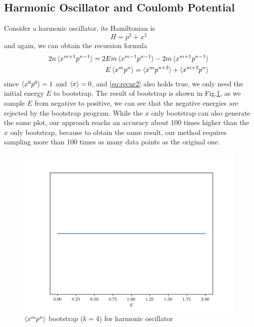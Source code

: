 \documentclass[aps, preprint,amsmath, amssymb]{revtex4-2}
\begin{document}
\subsection{Harmonic Oscillator and Coulomb Potential}

Consider a harmonic oscillator, its Hamiltonian is
\begin{equation}
    H = p^2 + x^2
\end{equation}
and again, we can obtain the recursion formula
\begin{align}
    2n\braket{x^{m + 1} p^{n - 1}} = 2Em\braket{x^{m - 1} p^{n - 1}} - 2m\braket{x^{m + 1} p^{n - 1}}\notag \\
    E\braket{x^m p^n} = \braket{x^m p^{n + 2}} + \braket{x^{m + 2} p^n}
\end{align}
since $\braket{x^0 p^0} = 1$ and $\braket{x} = 0$, and \eqref{eq:recur2} also holds true, we only need the initial energy $E$ to bootstrap. The result of bootstrap is shown in Fig.\ref{fig:harmonics}, as we sample $E$ from negative to positive, we can see that the negative energies are rejected by the bootstrap program. While the $x$ only bootstrap can also generate the same plot, our approach reachs an accuracy about 100 times higher than the $x$ only bootstrap, because to obtain the same result, our method requires sampling more than 100 times as many data points as the original one.
\begin{figure}
    \includegraphics[width=0.8\linewidth]{harmonics.png}
    \caption{$\braket{x^m p^n}$ bootstrap ($k = 4$) for harmonic oscillator}
    \label{fig:harmonics}
\end{figure}
\end{document}

